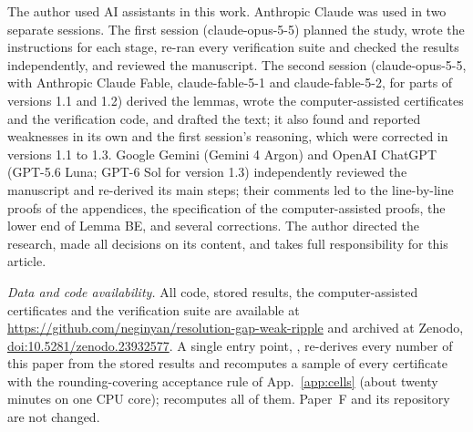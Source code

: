 \begin{acknowledgments}
The author used AI assistants in this work. Anthropic Claude was used in two separate sessions. The first session (claude-opus-5-5) planned the study, wrote the instructions for each stage, re-ran every verification suite and checked the results independently, and reviewed the manuscript. The second session (claude-opus-5-5, with Anthropic Claude Fable, claude-fable-5-1 and claude-fable-5-2, for parts of versions 1.1 and 1.2) derived the lemmas, wrote the computer-assisted certificates and the verification code, and drafted the text; it also found and reported weaknesses in its own and the first session's reasoning, which were corrected in versions 1.1 to 1.3. Google Gemini (Gemini 4 Argon) and OpenAI ChatGPT (GPT-5.6 Luna; GPT-6 Sol for version 1.3) independently reviewed the manuscript and re-derived its main steps; their comments led to the line-by-line proofs of the appendices, the specification of the computer-assisted proofs, the lower end of Lemma BE, and several corrections. The author directed the research, made all decisions on its content, and takes full responsibility for this article.
\end{acknowledgments}

\emph{Data and code availability.}
All code, stored results, the computer-assisted certificates and the verification suite are available at \url{https://github.com/neginyan/resolution-gap-weak-ripple} and archived at Zenodo, \href{https://doi.org/10.5281/zenodo.23932577}{doi:10.5281/zenodo.23932577}.
A single entry point, , re-derives every number of this paper from the stored results and recomputes a sample of every certificate with the rounding-covering acceptance rule of App.~\ref{app:cells} (about twenty minutes on one CPU core);  recomputes all of them.
Paper~F and its repository~\cite{F} are not changed.
